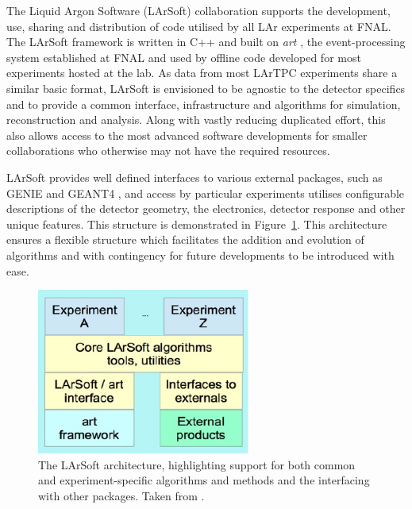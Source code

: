 The Liquid Argon Software (LArSoft) \cite{LArSoftWebsite,LArSoft2013,LArSoft2016,Snider2016} collaboration supports the development, use, sharing and distribution of code utilised by all LAr experiments at FNAL.  The LArSoft framework is written in C++ and built on \textit{art} \cite{artWebsite,art2012}, the event-processing system established at FNAL and used by offline code developed for most experiments hosted at the lab.  As data from most LArTPC experiments share a similar basic format, LArSoft is envisioned to be agnostic to the detector specifics and to provide a common interface, infrastructure and algorithms for simulation, reconstruction and analysis.  Along with vastly reducing duplicated effort, this also allows access to the most advanced software developments for smaller collaborations who otherwise may not have the required resources.

LArSoft provides well defined interfaces to various external packages, such as GENIE \cite{GENIE2010} and GEANT4 \cite{GEANT42006}, and access by particular experiments utilises configurable descriptions of the detector geometry, the electronics, detector response and other unique features.  This structure is demonstrated in Figure~\ref{fig:LArSoftStructure}.  This architecture ensures a flexible structure which facilitates the addition and evolution of algorithms and with contingency for future developments to be introduced with ease.

\begin{figure}
  \centering
  \includegraphics[width=7cm]{LArSoftStructure.pdf}
  \caption[The LArSoft architecture, highlighting support for both common and experiment-specific algorithms and methods and the interfacing with other packages.]{The LArSoft architecture, highlighting support for both common and experiment-specific algorithms and methods and the interfacing with other packages.  Taken from \cite{LArSoft2016}.}
  \label{fig:LArSoftStructure}
\end{figure}

